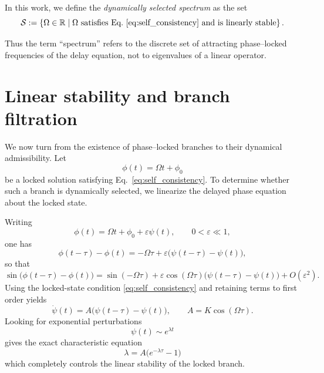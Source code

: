 \documentclass[11pt,a4paper]{article}
\begin{document}
        In this work, we define the \emph{dynamically selected spectrum} as the set
        \begin{equation}
            \mathcal{S} :=
            \left\{
            \Omega \in \mathbb{R} \;\middle|\;
            \Omega \text{ satisfies Eq.~\ref{eq:self_consistency} and is linearly stable}
            \right\}.
            \label{eq:frequency_set}
        \end{equation}

        Thus the term ``spectrum'' refers to the discrete set of attracting phase--locked frequencies of the delay equation, not to eigenvalues of a linear operator.

    \section{Linear stability and branch filtration}
    \label{sec:stability}
        
        We now turn from the existence of phase--locked branches to their dynamical admissibility. Let
        \begin{equation}
            \phi(t)=\Omega t+\phi_0
        \end{equation}
        be a locked solution satisfying Eq.~\ref{eq:self_consistency}. To determine whether such a branch is dynamically selected, we linearize the delayed phase equation about the locked state.
        
        Writing
        \begin{equation}
            \phi(t)=\Omega t+\phi_0+\varepsilon \psi(t),
            \qquad
            0<\varepsilon\ll 1,
        \end{equation}
        one has
        \begin{equation}
            \phi(t-\tau)-\phi(t)
            =
            -\Omega\tau+\varepsilon\big(\psi(t-\tau)-\psi(t)\big),
        \end{equation}
        so that
        \begin{equation}
            \sin\!\big(\phi(t-\tau)-\phi(t)\big)
            =
            \sin(-\Omega\tau)
            +
            \varepsilon \cos(\Omega\tau)\big(\psi(t-\tau)-\psi(t)\big)
            + O(\varepsilon^2).
        \end{equation}
        Using the locked-state condition \eqref{eq:self_consistency} and retaining terms to first order yields
        \begin{equation}
            \dot{\psi}(t)=A\big(\psi(t-\tau)-\psi(t)\big),
            \qquad
            A=K\cos(\Omega\tau).
            \label{eq:psi-linear}
        \end{equation}
        Looking for exponential perturbations
        \begin{equation}
            \psi(t)\sim e^{\lambda t}
        \end{equation}
        gives the exact characteristic equation
        \begin{equation}
            \boxed{
            \lambda = A\big(e^{-\lambda\tau}-1\big)
            }
            \label{eq:characteristic-main}
        \end{equation}
        which completely controls the linear stability of the locked branch.
        
\end{document}
